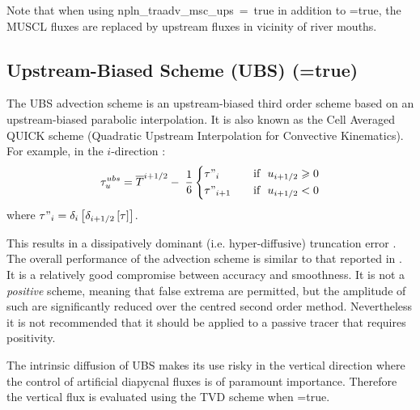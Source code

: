 \documentclass[NEMO_book]{subfiles}
\begin{document}
Note that when using np{ln\_traadv\_msc\_ups}~=~true in addition to =true, 
the MUSCL fluxes are replaced by upstream fluxes in vicinity of river mouths.

\subsection   [Upstream-Biased Scheme (UBS) (\np{ln\_traadv\_ubs})]
			{Upstream-Biased Scheme (UBS) (=true)}
\label{TRA_adv_ubs}

The UBS advection scheme is an upstream-biased third order scheme based on 
an upstream-biased parabolic interpolation. It is also known as the Cell 
Averaged QUICK scheme (Quadratic Upstream Interpolation for Convective 
Kinematics). For example, in the $i$-direction :
\begin{equation} \label{Eq_tra_adv_ubs}
   \tau _u^{ubs} =\overline T ^{i+1/2}-\;\frac{1}{6} \left\{      
   \begin{aligned}
         &\tau"_i        	& \quad \text{if }\ u_{i+1/2} \geqslant 0      \\
         &\tau"_{i+1}	& \quad \text{if }\ u_{i+1/2}       <       0
   \end{aligned}    \right.
\end{equation}
where $\tau "_i =\delta _i \left[ {\delta _{i+1/2} \left[ \tau \right]} \right]$.

This results in a dissipatively dominant (i.e. hyper-diffusive) truncation 
error \citep{Shchepetkin_McWilliams_OM05}. The overall performance of the advection 
scheme is similar to that reported in \cite{Farrow1995}. 
It is a relatively good compromise between accuracy and smoothness. 
It is not a \emph{positive} scheme, meaning that false extrema are permitted, 
but the amplitude of such are significantly reduced over the centred second 
order method. Nevertheless it is not recommended that it should be applied 
to a passive tracer that requires positivity. 

The intrinsic diffusion of UBS makes its use risky in the vertical direction 
where the control of artificial diapycnal fluxes is of paramount importance. 
Therefore the vertical flux is evaluated using the TVD scheme when 
=true.
\end{document}
